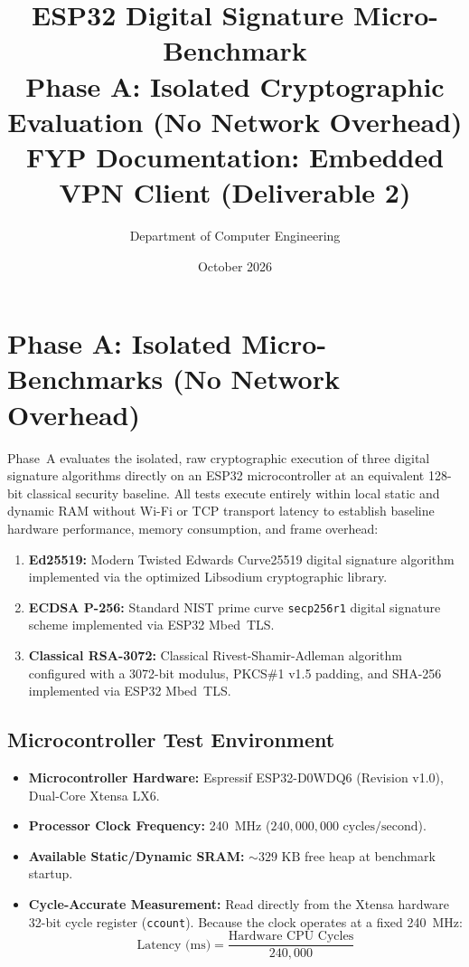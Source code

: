 \documentclass[11pt,a4paper]{article}
\title{\textbf{ESP32 Digital Signature Micro-Benchmark}\\[0.2em]\large Phase A: Isolated Cryptographic Evaluation (No Network Overhead)\\[0.2em]\normalsize FYP Documentation: Embedded VPN Client (Deliverable 2)}
\author{Department of Computer Engineering}
\date{October 2026}
\begin{document}
\maketitle

\section{Phase A: Isolated Micro-Benchmarks (No Network Overhead)}

Phase~A evaluates the isolated, raw cryptographic execution of three digital signature algorithms directly on an ESP32 microcontroller at an equivalent 128-bit classical security baseline. All tests execute entirely within local static and dynamic RAM without Wi-Fi or TCP transport latency to establish baseline hardware performance, memory consumption, and frame overhead:
\begin{enumerate}
    \item \textbf{Ed25519:} Modern Twisted Edwards Curve25519 digital signature algorithm implemented via the optimized Libsodium cryptographic library.
    \item \textbf{ECDSA P-256:} Standard NIST prime curve \texttt{secp256r1} digital signature scheme implemented via ESP32 Mbed~TLS.
    \item \textbf{Classical RSA-3072:} Classical Rivest-Shamir-Adleman algorithm configured with a 3072-bit modulus, PKCS\#1 v1.5 padding, and SHA-256 implemented via ESP32 Mbed~TLS.
\end{enumerate}

\subsection{Microcontroller Test Environment}

\begin{itemize}
    \item \textbf{Microcontroller Hardware:} Espressif ESP32-D0WDQ6 (Revision v1.0), Dual-Core Xtensa LX6.
    \item \textbf{Processor Clock Frequency:} 240~MHz ($240,000,000\text{ cycles/second}$).
    \item \textbf{Available Static/Dynamic SRAM:} $\sim 329\text{ KB}$ free heap at benchmark startup.
    \item \textbf{Cycle-Accurate Measurement:} Read directly from the Xtensa hardware 32-bit cycle register (\texttt{ccount}). Because the clock operates at a fixed 240~MHz:
    \begin{equation}
    \text{Latency (ms)} = \frac{\text{Hardware CPU Cycles}}{240,000}
    \end{equation}
\end{itemize}
\end{document}
